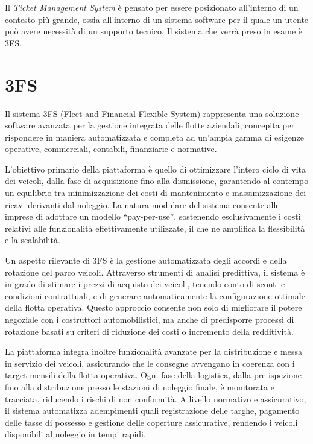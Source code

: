 Il \textit{Ticket Management System} è pensato per essere posizionato all'interno di un contesto più grande, ossia all'interno di un sistema software
per il quale un utente può avere necessità di un supporto tecnico. Il sistema che verrà preso in esame è 3FS.

\section{3FS}
Il sistema 3FS (Fleet and Financial Flexible System) rappresenta una soluzione software avanzata per la gestione integrata delle flotte aziendali, 
concepita per rispondere in maniera automatizzata e completa ad un'ampia gamma di esigenze operative, commerciali, contabili, finanziarie e normative.

L'obiettivo primario della piattaforma è quello di ottimizzare l'intero ciclo di vita dei veicoli, dalla fase di acquisizione fino alla dismissione, 
garantendo al contempo un equilibrio tra minimizzazione dei costi di mantenimento e massimizzazione dei ricavi derivanti dal noleggio. La natura 
modulare del sistema consente alle imprese di adottare un modello “pay-per-use”, sostenendo esclusivamente i costi relativi alle funzionalità 
effettivamente utilizzate, il che ne amplifica la flessibilità e la scalabilità.

Un aspetto rilevante di 3FS è la gestione automatizzata degli accordi e della rotazione del parco veicoli. Attraverso strumenti di analisi 
predittiva, il sistema è in grado di stimare i prezzi di acquisto dei veicoli, tenendo conto di sconti e condizioni contrattuali, e di 
generare automaticamente la configurazione ottimale della flotta operativa. Questo approccio consente non solo di migliorare il potere negoziale 
con i costruttori automobilistici, ma anche di predisporre processi di rotazione basati su criteri di riduzione dei costi o incremento della 
redditività.

La piattaforma integra inoltre funzionalità avanzate per la distribuzione e messa in servizio dei veicoli, assicurando che le consegne 
avvengano in coerenza con i target mensili della flotta operativa. Ogni fase della logistica, dalla pre-ispezione fino alla distribuzione 
presso le stazioni di noleggio finale, è monitorata e tracciata, riducendo i rischi di non conformità. A livello normativo e assicurativo, 
il sistema automatizza adempimenti quali registrazione delle targhe, pagamento delle tasse di possesso e gestione delle coperture assicurative,
rendendo i veicoli disponibili al noleggio in tempi rapidi.

